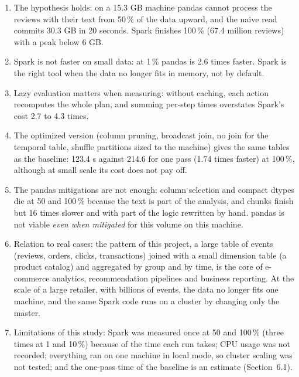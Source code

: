 \documentclass[11pt,a4paper]{article}
\begin{document}
\begin{enumerate}
  \item The hypothesis holds: on a 15.3 GB machine pandas cannot process the reviews with
  their text from 50\,\% of the data upward, and the naive read commits 30.3 GB in 20 seconds.
  Spark finishes 100\,\% (67.4 million reviews) with a peak below 6 GB.
  \item Spark is not faster on small data: at 1\,\% pandas is 2.6 times faster. Spark is the
  right tool when the data no longer fits in memory, not by default.
  \item Lazy evaluation matters when measuring: without caching, each action recomputes the
  whole plan, and summing per-step times overstates Spark's cost 2.7 to 4.3 times.
  \item The optimized version (column pruning, broadcast join, no join for the temporal table,
  shuffle partitions sized to the machine) gives the same tables as the baseline: 123.4 s
  against 214.6 for one pass (1.74 times faster) at 100\,\%, although at small scale its cost
  does not pay off.
  \item The pandas mitigations are not enough: column selection and compact dtypes die at 50
  and 100\,\% because the text is part of the analysis, and chunks finish but 16 times slower
  and with part of the logic rewritten by hand. pandas is not viable \emph{even when mitigated}
  for this volume on this machine.
  \item Relation to real cases: the pattern of this project, a large table of events (reviews,
  orders, clicks, transactions) joined with a small dimension table (a product catalog) and
  aggregated by group and by time, is the core of e-commerce analytics, recommendation
  pipelines and business reporting. At the scale of a large retailer, with billions of events,
  the data no longer fits one machine, and the same Spark code runs on a cluster by changing
  only the master.
  \item Limitations of this study: Spark was measured once at 50 and 100\,\% (three times at
  1 and 10\,\%) because of the time each run takes; CPU usage was not recorded; everything ran
  on one machine in local mode, so cluster scaling was not tested; and the one-pass time of the
  baseline is an estimate (Section~6.1).
\end{enumerate}
\end{document}
